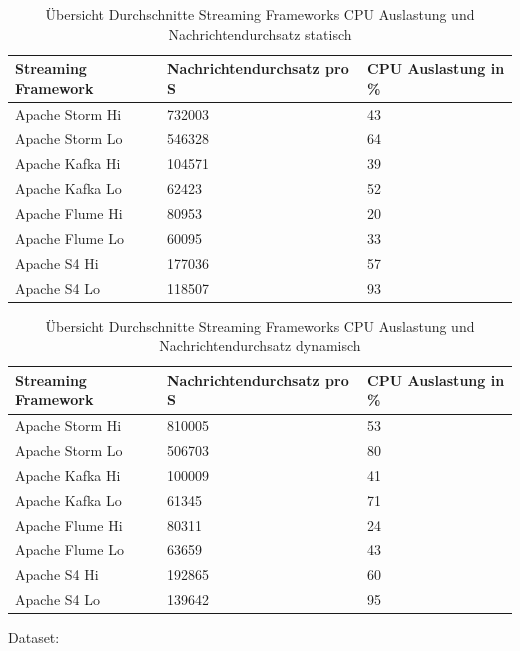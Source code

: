 \begin{table}[tbp]
	\centering
		\begin{tabular}{@{}lll@{}} \toprule
			\textbf{Streaming Framework} & \textbf{Nachrichtendurchsatz pro S} & \textbf{CPU Auslastung in \%} \\ \midrule
			Apache Storm Hi & 732003 & 43 \\
			Apache Storm Lo & 546328 & 64 \\
			Apache Kafka Hi & 104571 & 39 \\
			Apache Kafka Lo & 62423 & 52 \\
			Apache Flume Hi & 80953 & 20 \\
			Apache Flume Lo & 60095 & 33 \\
			Apache S4 Hi & 177036 & 57 \\
			Apache S4 Lo & 118507 & 93 \\
			\bottomrule			
		\end{tabular}
	\caption{Übersicht Durchschnitte Streaming Frameworks CPU Auslastung und Nachrichtendurchsatz statisch}
	\label{tab:avgSta}
\end{table}

\begin{table}[tbp]
	\centering
		\begin{tabular}{@{}lll@{}} \toprule
			\textbf{Streaming Framework} & \textbf{Nachrichtendurchsatz pro S} & \textbf{CPU Auslastung in \%} \\ \midrule
			Apache Storm Hi & 810005 & 53 \\
			Apache Storm Lo & 506703 & 80 \\
			Apache Kafka Hi & 100009 & 41 \\
			Apache Kafka Lo & 61345 & 71 \\
			Apache Flume Hi & 80311 & 24 \\
			Apache Flume Lo & 63659 & 43 \\
			Apache S4 Hi & 192865 & 60 \\
			Apache S4 Lo & 139642 & 95 \\
			\bottomrule			
		\end{tabular}
	\caption{Übersicht Durchschnitte Streaming Frameworks CPU Auslastung und Nachrichtendurchsatz dynamisch}
	\label{tab:avgDyn}
\end{table}

Dataset: 